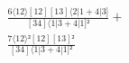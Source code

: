 \documentclass[varwidth, border=5pt]{standalone}
\begin{document}
\begin{my}
$\begin{gathered}
\scriptscriptstyle\frac{6⟨12⟩[12][13]⟨2|1+4|3]}{[34]⟨1|3+4|1]²} +\\
\scriptscriptstyle\frac{7⟨12⟩²[12][13]²}{[34]⟨1|3+4|1]²} \phantom{+}
\end{gathered}$
\end{my}
\end{document}
